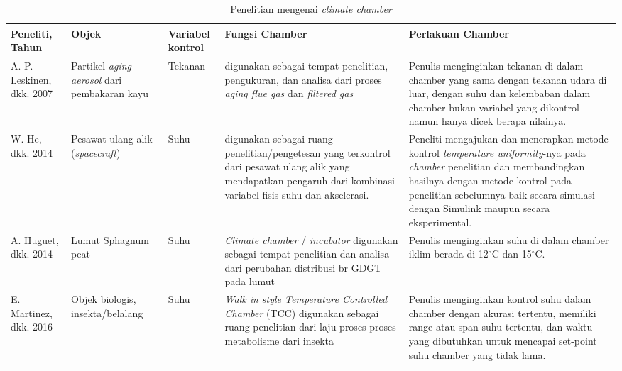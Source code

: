 \begin{landscape}
	\begin{table}[hbt!]
		\caption{Penelitian mengenai \textit{climate chamber}}
		\label{tbl:2:studichamber}
		\centering
		\begin{tabular}{|p{1.6cm}|p{2.3cm}|p{1.7cm}|p{7.3cm}|p{9cm}|}
			\hline
			
			Peneliti, Tahun & Objek & Variabel kontrol & Fungsi Chamber & Perlakuan Chamber \\ \hline
			
			A. P. Leskinen, dkk. 2007 \cite{article4} & Partikel \textit{aging aerosol} dari pembakaran kayu & Tekanan & digunakan sebagai tempat penelitian, pengukuran, dan analisa dari proses \textit{aging flue gas} dan \textit{filtered gas} & Penulis menginginkan tekanan di dalam chamber yang sama dengan tekanan udara di luar, dengan suhu dan kelembaban dalam chamber bukan variabel yang dikontrol namun hanya dicek berapa nilainya. \\ \hline
			
			W. He, dkk. 2014 \cite{article5} & Pesawat ulang alik (\textit{spacecraft}) & Suhu & digunakan sebagai ruang penelitian/pengetesan yang terkontrol dari pesawat ulang alik yang mendapatkan pengaruh dari kombinasi variabel fisis suhu dan akselerasi. & Peneliti mengajukan dan menerapkan metode kontrol \textit{temperature uniformity}-nya pada \textit{chamber} penelitian dan membandingkan hasilnya dengan metode kontrol pada penelitian sebelumnya baik secara simulasi dengan Simulink maupun secara eksperimental. \\ \hline
			
			A. Huguet, dkk. 2014 \cite{article6} & Lumut Sphagnum peat & Suhu & \textit{Climate chamber} / \textit{incubator} digunakan sebagai tempat penelitian dan analisa dari perubahan distribusi br GDGT pada lumut & Penulis menginginkan suhu di dalam chamber iklim berada di 12$^{\circ}$C dan 15$^{\circ}$C. \\ \hline
			
			E. Martinez, dkk. 2016 \cite{article7} & Objek biologis, insekta/belalang & Suhu & \textit{Walk in style Temperature Controlled Chamber} (TCC) digunakan sebagai ruang penelitian dari laju proses-proses metabolisme dari insekta & Penulis menginginkan kontrol suhu dalam chamber dengan akurasi tertentu, memiliki range atau span suhu tertentu, dan waktu yang dibutuhkan untuk mencapai set-point suhu chamber yang tidak lama. \\ \hline
			

\end{tabular}
\end{table}
\end{landscape}
